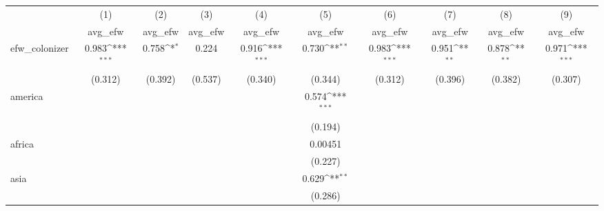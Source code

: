{
\def\sym#1{\ifmmode^{#1}\else\(^{#1}\)\fi}
\begin{tabular}{l*{9}{c}}
\hline\hline
            &\multicolumn{1}{c}{(1)}&\multicolumn{1}{c}{(2)}&\multicolumn{1}{c}{(3)}&\multicolumn{1}{c}{(4)}&\multicolumn{1}{c}{(5)}&\multicolumn{1}{c}{(6)}&\multicolumn{1}{c}{(7)}&\multicolumn{1}{c}{(8)}&\multicolumn{1}{c}{(9)}\\
            &\multicolumn{1}{c}{avg\_efw}&\multicolumn{1}{c}{avg\_efw}&\multicolumn{1}{c}{avg\_efw}&\multicolumn{1}{c}{avg\_efw}&\multicolumn{1}{c}{avg\_efw}&\multicolumn{1}{c}{avg\_efw}&\multicolumn{1}{c}{avg\_efw}&\multicolumn{1}{c}{avg\_efw}&\multicolumn{1}{c}{avg\_efw}\\
\hline
efw\_colonizer&       0.983\sym{***}&       0.758\sym{*}  &       0.224         &       0.916\sym{***}&       0.730\sym{**} &       0.983\sym{***}&       0.951\sym{**} &       0.878\sym{**} &       0.971\sym{***}\\
            &     (0.312)         &     (0.392)         &     (0.537)         &     (0.340)         &     (0.344)         &     (0.312)         &     (0.396)         &     (0.382)         &     (0.307)         \\
[1em]
america     &                     &                     &                     &                     &       0.574\sym{***}&                     &                     &                     &                     \\
            &                     &                     &                     &                     &     (0.194)         &                     &                     &                     &                     \\
[1em]
africa      &                     &                     &                     &                     &     0.00451         &                     &                     &                     &                     \\
            &                     &                     &                     &                     &     (0.227)         &                     &                     &                     &                     \\
[1em]
asia        &                     &                     &                     &                     &       0.629\sym{**} &                     &                     &                     &                     \\
            &                     &                     &                     &                     &     (0.286)         &                     &                     &                     &                     \\

\end{tabular}}
